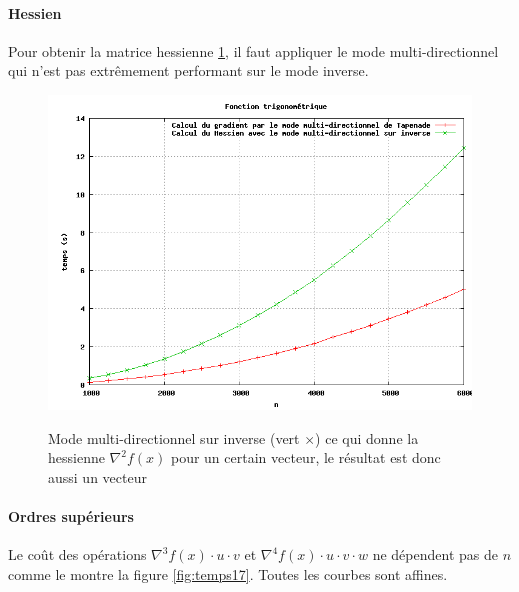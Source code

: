\paragraph{Hessien}

Pour obtenir la matrice hessienne \ref{fig:temps16}, il faut appliquer le mode multi-directionnel qui n'est pas 
extrêmement performant sur le mode inverse. 


\begin{figure}
\caption{Mode multi-directionnel sur inverse (vert $\times$) ce qui donne la hessienne $\nabla^2 f(x)$ pour un certain vecteur, le r\'esultat
est donc aussi un vecteur}
\center
\includegraphics[scale=0.4]{figures/temps16.png}
\label{fig:temps16}
\end{figure}



\paragraph{Ordres sup\'erieurs}
Le coût des op\'erations $\nabla^3 f(x)\cdot u \cdot v$ et $\nabla^4f(x)\cdot u \cdot v \cdot w$ ne d\'ependent pas de $n$ comme le montre la figure
\ref{fig:temps17}. Toutes les courbes sont affines.

